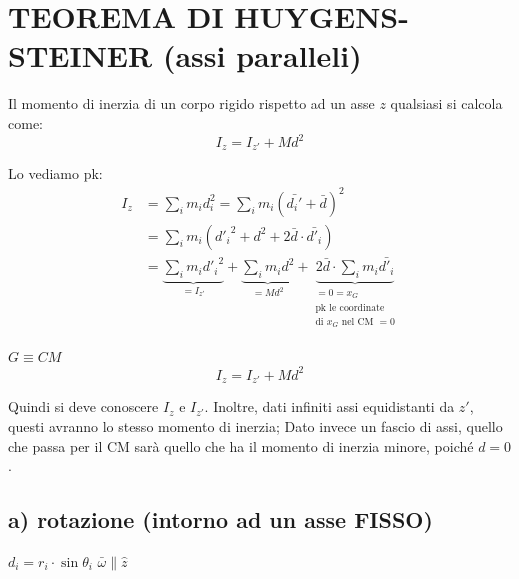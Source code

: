 \section*{TEOREMA DI HUYGENS-STEINER (assi paralleli)}

\begin{figure}[H]
\centering
{}
\end{figure}

Il momento di inerzia di un corpo rigido rispetto ad un asse $z$ qualsiasi si calcola come:
$$ I_z = I_{z'} + M d^2 $$

Lo vediamo pk:
\begin{align*}
I_z &= \sum_i m_i d_i^2 = \sum_i m_i ( \bar{d_i'} + \bar{d} )^2 \\
&= \sum_i m_i ( {d'_i}^2 + d^2 + 2\bar{d} \cdot \bar{d'_i} ) \\
&= \underbrace{\sum_i m_i {d'_i}^2}_{= I_{z'}} + \underbrace{\sum_i m_i d^2}_{= M d^2} + \underbrace{2\bar{d} \cdot \sum_i m_i \bar{d'_i}}_{\substack{= 0 = x_G \\ \text{pk le coordinate} \\ \text{di } x_G \text{ nel CM } = 0}}
\end{align*}

$G \equiv CM$
\begin{equation}
I_z = I_{z'} + M d^2
\end{equation}

Quindi si deve conoscere $I_z$ e $I_{z'}$. Inoltre, dati infiniti assi equidistanti da $z'$, questi avranno lo stesso momento di inerzia; Dato invece un fascio di assi, quello che passa per il CM sarà quello che ha il momento di inerzia minore, poiché $d = 0$.

\subsection*{a) rotazione (intorno ad un asse FISSO)}
\begin{figure}[H]
\centering
{}
\end{figure}
$d_i = r_i \cdot \sin \theta_i$ \quad $\bar{\omega} \parallel \hat{z}$

